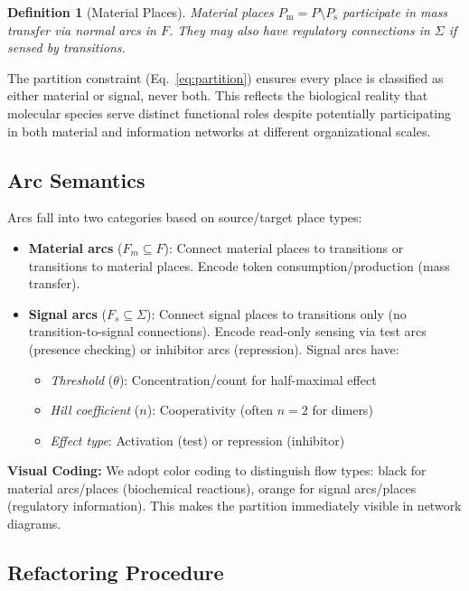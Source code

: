 \documentclass[twocolumn,10pt]{article}
\newtheorem{definition}{Definition}
\newcommand{\Pm}{P_{\text{m}}}
\newcommand{\Ps}{P_{\text{s}}}
\begin{document}
\begin{definition}[Material Places]
Material places $\Pm = P \setminus \Ps$ participate in mass transfer via normal arcs in $F$. They may also have regulatory connections in $\Sigma$ if sensed by transitions.
\end{definition}

The partition constraint (Eq.~\ref{eq:partition}) ensures every place is classified as either material or signal, never both. This reflects the biological reality that molecular species serve distinct functional roles despite potentially participating in both material and information networks at different organizational scales.

\subsection{Arc Semantics}

Arcs fall into two categories based on source/target place types:

\begin{itemize}
\item \textbf{Material arcs} ($F_m \subseteq F$): Connect material places to transitions or transitions to material places. Encode token consumption/production (mass transfer).
  
\item \textbf{Signal arcs} ($F_s \subseteq \Sigma$): Connect signal places to transitions only (no transition-to-signal connections). Encode read-only sensing via test arcs (presence checking) or inhibitor arcs (repression). Signal arcs have:
  \begin{itemize}
  \item \textit{Threshold} ($\theta$): Concentration/count for half-maximal effect
  \item \textit{Hill coefficient} ($n$): Cooperativity (often $n=2$ for dimers)
  \item \textit{Effect type}: Activation (test) or repression (inhibitor)
  \end{itemize}
\end{itemize}

\textbf{Visual Coding:} We adopt color coding to distinguish flow types: black for material arcs/places (biochemical reactions), orange for signal arcs/places (regulatory information). This makes the partition immediately visible in network diagrams.

\subsection{Refactoring Procedure}
\end{document}
